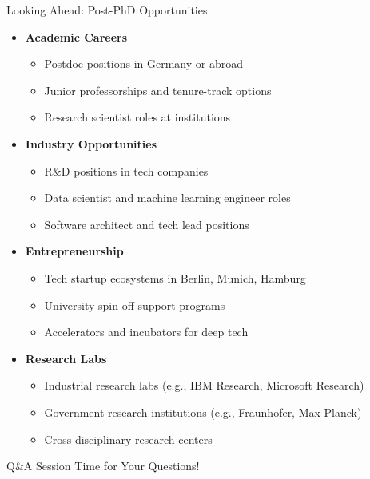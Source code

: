 \documentclass[aspectratio=169,10pt]{beamer}
\begin{document}
\begin{frame}{Looking Ahead: Post-PhD Opportunities}
\begin{itemize}
    \item \textbf{Academic Careers}
    \begin{itemize}
        \item Postdoc positions in Germany or abroad
        \item Junior professorships and tenure-track options
        \item Research scientist roles at institutions
    \end{itemize}
    \item \textbf{Industry Opportunities}
    \begin{itemize}
        \item R\&D positions in tech companies
        \item Data scientist and machine learning engineer roles
        \item Software architect and tech lead positions
    \end{itemize}
    \item \textbf{Entrepreneurship}
    \begin{itemize}
        \item Tech startup ecosystems in Berlin, Munich, Hamburg
        \item University spin-off support programs
        \item Accelerators and incubators for deep tech
    \end{itemize}
    \item \textbf{Research Labs}
    \begin{itemize}
        \item Industrial research labs (e.g., IBM Research, Microsoft Research)
        \item Government research institutions (e.g., Fraunhofer, Max Planck)
        \item Cross-disciplinary research centers
    \end{itemize}
\end{itemize}
\end{frame}

\begin{frame}{Q\&A Session}
\centering
\large{Time for Your Questions!}

\vspace{1cm}

\end{frame}
\end{document}
